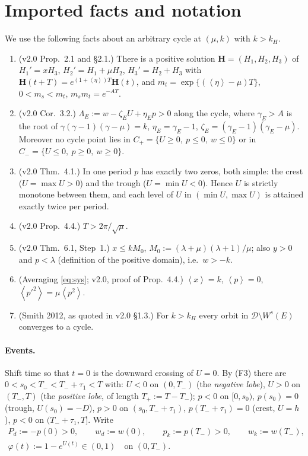 \documentclass[11pt,a4paper]{article}
\theoremstyle{remark}\newtheorem{remark}[theorem]{Remark}
\newcommand{\avg}[1]{\left\langle #1\right\rangle}
\begin{document}
\section{Imported facts and notation}
We use the following facts about an arbitrary cycle at $(\mu,k)$ with $k>k_H$.
\begin{enumerate}[label=\textup{(F\arabic*)}]
\item (v2.0 Prop.~2.1 and \S2.1.) There is a positive solution $\mathbf H=(H_1,H_2,H_3)$ of
$H_1'=xH_3$, $H_2'=H_1+\mu H_2$, $H_3'=H_2+H_3$ with $\mathbf H(t+T)=e^{(1+\avg\eta)T}\mathbf H(t)$, and
$m_t=\exp\{(\avg\eta-\mu)T\}$, $0<m_s<m_t$, $m_sm_t=e^{-AT}$.
\item (v2.0 Cor.~3.2.) $\Lambda_E:=w-\zeta_EU+\eta_Ep>0$ along the cycle, where $\gamma_E>A$ is the
root of $\gamma(\gamma-1)(\gamma-\mu)=k$, $\eta_E=\gamma_E-1$, $\zeta_E=(\gamma_E-1)(\gamma_E-\mu)$.
Moreover no cycle point lies in $C_+=\{U\ge0,\ p\le0,\ w\le0\}$ or in $C_-=\{U\le0,\ p\ge0,\ w\ge0\}$.
\item (v2.0 Thm.~4.1.) In one period $p$ has exactly two zeros, both simple: the crest ($U=\max U>0$)
and the trough ($U=\min U<0$). Hence $U$ is strictly monotone between them, and each level of $U$ in
$(\min U,\max U)$ is attained exactly twice per period.
\item (v2.0 Prop.~4.4.) $T>2\pi/\sqrt\mu$.
\item (v2.0 Thm.~6.1, Step~1.) $x\le kM_0$, $M_0:=(\lambda+\mu)(\lambda+1)/\mu$; also $y>0$ and
$p<\lambda$ (definition of the positive domain), i.e.\ $w>-k$.
\item (Averaging \eqref{eq:sys}; v2.0, proof of Prop.~4.4.) $\avg x=k$, $\avg p=0$,
$\avg{p'^2}=\mu\avg{p^2}$.
\item (Smith 2012, as quoted in v2.0 \S1.3.) For $k>k_H$ every orbit in $\mathcal D\setminus W^s(E)$
converges to a cycle.
\end{enumerate}
\paragraph{Events.} Shift time so that $t=0$ is the downward crossing of $U=0$. By (F3) there are
$0<s_0<T_-<T_-+\tau_1<T$ with:
$U<0$ on $(0,T_-)$ (the \emph{negative lobe}), $U>0$ on $(T_-,T)$ (the \emph{positive lobe},
of length $T_+:=T-T_-$); $p<0$ on $[0,s_0)$, $p(s_0)=0$ (trough, $U(s_0)=-D$), $p>0$ on $(s_0,T_-+\tau_1)$,
$p(T_-+\tau_1)=0$ (crest, $U=h$), $p<0$ on $(T_-+\tau_1,T]$. Write
\begin{gather*}
P_d:=-p(0)>0,\qquad w_d:=w(0),\qquad p_k:=p(T_-)>0,\qquad w_k:=w(T_-),\\
\varphi(t):=1-e^{U(t)}\in(0,1)\quad\text{on }(0,T_-).
\end{gather*}
\end{document}
